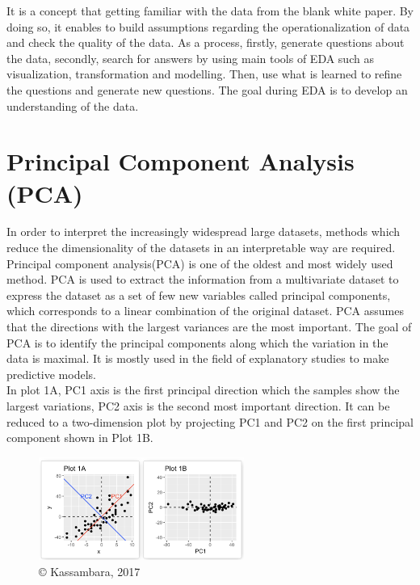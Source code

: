 \documentclass[]{book}
\begin{document}
It is a concept that getting familiar with the data from the blank white paper.
By doing so, it enables to build assumptions regarding the operationalization of data and check the quality of the data. As a process, firstly, generate questions about the data, secondly, search for answers by using main tools of EDA such as visualization, transformation and modelling. Then, use what is learned to refine the questions and generate new questions.
The goal during EDA is to develop an understanding of the data.

\hypertarget{principal-component-analysis-pca}{%
\section{Principal Component Analysis (PCA)}\label{principal-component-analysis-pca}}

In order to interpret the increasingly widespread large datasets, methods which reduce the dimensionality of the datasets in an interpretable way are required. Principal component analysis(PCA) is one of the oldest and most widely used method.
PCA is used to extract the information from a multivariate dataset to express the dataset as a set of few new variables called principal components, which corresponds to a linear combination of the original dataset. PCA assumes that the directions with the largest variances are the most important. The goal of PCA is to identify the principal components along which the variation in the data is maximal.
It is mostly used in the field of explanatory studies to make predictive models.\\
In plot 1A, PC1 axis is the first principal direction which the samples show the largest variations, PC2 axis is the second most important direction. It can be reduced to a two-dimension plot by projecting PC1 and PC2 on the first principal component shown in Plot 1B.

\begin{figure}
\centering
\includegraphics[width=0.6\textwidth,height=\textheight]{PCA_intro.png}
\caption{© Kassambara, 2017}
\end{figure}
\end{document}
